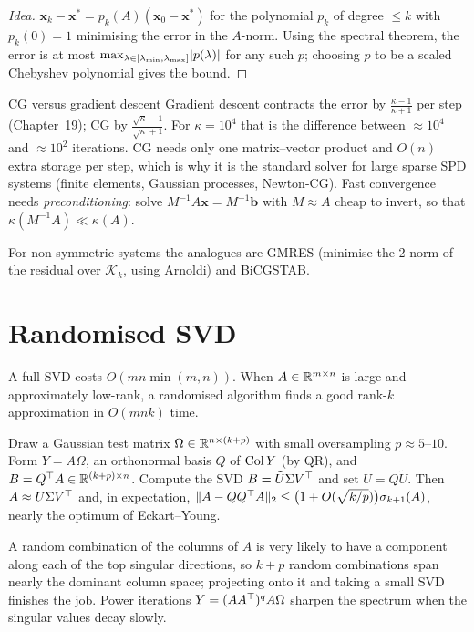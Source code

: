 \begin{proof}[Idea]
$\mathbf{x}_k-\mathbf{x}^*=p_k(A)(\mathbf{x}_0-\mathbf{x}^*)$ for the polynomial $p_k$ of degree $\le k$ with $p_k(0)=1$ minimising the error in the $A$-norm. Using the spectral theorem, the error is at most $\max_{\lambda\in[\lambda_{\min},\lambda_{\max}]}\lvert p(\lambda)\rvert$ for any such $p$; choosing $p$ to be a scaled Chebyshev polynomial gives the bound.
\end{proof}

\begin{interview}{CG versus gradient descent}
Gradient descent contracts the error by $\frac{\kappa-1}{\kappa+1}$ per step (Chapter~19); CG by $\frac{\sqrt\kappa-1}{\sqrt\kappa+1}$. For $\kappa=10^4$ that is the difference between $\approx10^4$ and $\approx10^2$ iterations. CG needs only one matrix--vector product and $O(n)$ extra storage per step, which is why it is the standard solver for large sparse SPD systems (finite elements, Gaussian processes, Newton-CG). Fast convergence needs \emph{preconditioning}: solve $M^{-1}A\mathbf{x}=M^{-1}\mathbf{b}$ with $M\approx A$ cheap to invert, so that $\kappa(M^{-1}A)\ll\kappa(A)$.
\end{interview}

For non-symmetric systems the analogues are GMRES (minimise the 2-norm of the residual over $\mathcal{K}_k$, using Arnoldi) and BiCGSTAB.

\section{Randomised SVD}

A full SVD costs $O(mn\min(m,n))$. When $A\in\mathbb{R}^{m\times n}$ is large and approximately low-rank, a randomised algorithm finds a good rank-$k$ approximation in $O(mnk)$ time.

\begin{theorem}\label{thm:randsvd}
Draw a Gaussian test matrix $\Omega\in\mathbb{R}^{n\times(k+p)}$ with small oversampling $p\approx5$--$10$. Form $Y=A\Omega$, an orthonormal basis $Q$ of $\operatorname{Col} Y$ (by QR), and $B=Q^{\top} A\in\mathbb{R}^{(k+p)\times n}$. Compute the SVD $B=\tilde U\Sigma V^{\top}$ and set $U=Q\tilde U$. Then $A\approx U\Sigma V^{\top}$ and, in expectation, $\lVert A-QQ^{\top} A\rVert_2\le\big(1+O(\sqrt{k/p})\big)\sigma_{k+1}(A)$, nearly the optimum of Eckart--Young.
\end{theorem}

\begin{intuition}
A random combination of the columns of $A$ is very likely to have a component along each of the top singular directions, so $k+p$ random combinations span nearly the dominant column space; projecting onto it and taking a small SVD finishes the job. Power iterations $Y=(AA^{\top})^qA\Omega$ sharpen the spectrum when the singular values decay slowly.
\end{intuition}

